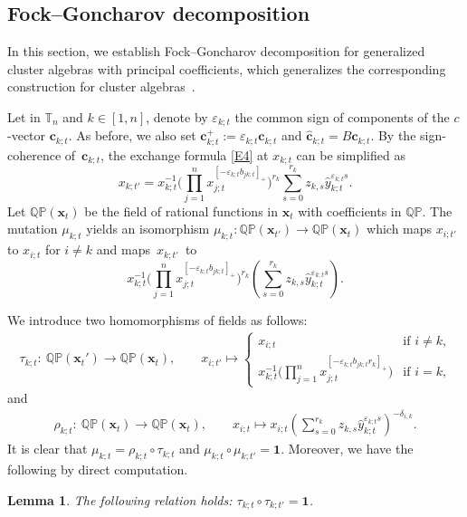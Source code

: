 \documentclass[10pt,a4paper]{amsart}
\newcommand{\id}{\mathbf{1}}
\numberwithin{equation}{section}
\newtheorem{Lemma}[Theorem]{Lemma}
\begin{document}
\subsection{Fock--Goncharov decomposition}\label{S3}
In this section, we establish Fock--Goncharov decomposition for generalized cluster algebras with principal coefficients, which generalizes the corresponding construction for cluster algebras~\mbox{\cite{fock2009,nakanishi2023}}.



Let  in $\mathbb{T}_n$ and $k\in [1,n]$, denote by $\varepsilon_{k;t}$ the common sign of components of the $c$-vector $\mathbf{c}_{k;t}$. As before, we also set $\mathbf{c}_{k;t}^+:=\varepsilon_{k;t}\mathbf{c}_{k;t}$ and $\mathbf{\hat{c}}_{k;t}=B\mathbf{c}_{k;t}$. By the sign-coherence of~$\mathbf{c}_{k;t}$, the exchange formula \eqref{E4} at $x_{k;t}$ can be simplified as
\[
x_{k;t'}=x_{k;t}^{-1}\Biggl(\prod\limits_{j=1}^{n}x_{j;t}^{[-\varepsilon_{k;t} b_{jk;t}]_+}\Biggr)^{r_k}\sum\limits_{s=0}^{r_k}z_{k,s}\hat{y}_{k;t}^{\varepsilon_{k;t} s}.
\]
Let $\mathbb{Q}\mathbb{P}(\mathbf{x}_t)$ be the field of rational functions in $\mathbf{x}_t$ with coefficients in $\mathbb{Q}\mathbb{P}$. The mutation $\mu_{k;t}$ yields an isomorphism $\mu_{k;t}\colon\mathbb{Q}\mathbb{P}(\mathbf{x}_{t'})\to \mathbb{Q}\mathbb{P}(\mathbf{x}_t)$ which maps $x_{i;t'}$ to $x_{i;t}$ for $i\neq k$ and maps~$x_{k;t'}$~to
\[
x_{k;t}^{-1}\Biggl(\prod\limits_{j=1}^{n}x_{j;t}^{[-\varepsilon_{k;t} b_{jk;t}]_+}\Biggr)^{r_k}\left(\sum\limits_{s=0}^{r_k}z_{k,s}\hat{y}_{k;t}^{\varepsilon_{k;t} s}\right).
\]


 We introduce two homomorphisms of fields as follows:
\begin{align*}
 \tau_{k;t}\colon\ \mathbb{QP}(\mathbf{x}_t')\longrightarrow\mathbb{QP}(\mathbf{x}_t),\qquad
 x_{i;t'}\mapsto
 \begin{cases}
 x_{i;t} & \text{if $i\neq k$,}\\
 \displaystyle x_{k;t}^{-1}\biggl(\prod\limits_{j=1}^{n}x_{j;t}^{[-\varepsilon_{k;t}b_{jk;t}r_k]_+}\biggr) & \text{if $i=k$,}
 \end{cases}
 \end{align*} and
 \begin{align*}
 \rho_{k;t}\colon\ \mathbb{QP}(\mathbf{x}_t)\longrightarrow\mathbb{QP}(\mathbf{x}_t),\qquad
 x_{i;t}\mapsto x_{i;t}\left(\sum\limits_{s=0}^{r_k}z_{k,s}\hat{y}^{\varepsilon_{k;t}s}_{k;t}\right)^{-\delta_{i,k}}.
 \end{align*}
It is clear that $\mu_{k;t}=\rho_{k;t}\circ\tau_{k;t}$ and $\mu_{k;t}\circ\mu_{k;t'}=\id$. Moreover, we have the following by direct computation.
\begin{Lemma}\label{P8}
 The following relation holds:
$
 \tau_{k;t}\circ\tau_{k;t'}=\id$.
\end{Lemma}
\end{document}
